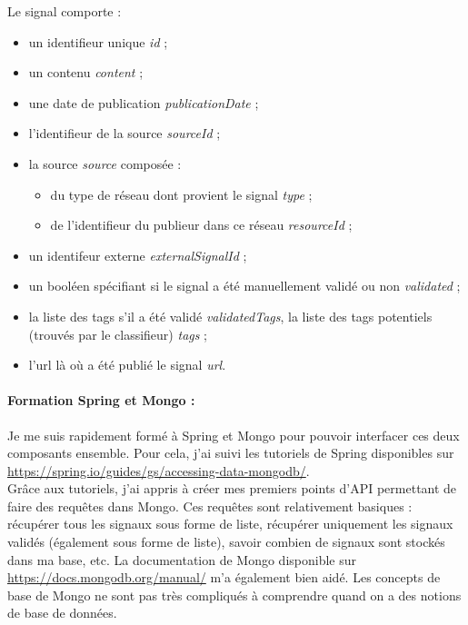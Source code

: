         Le signal comporte :
        \begin{itemize}
            \item un identifieur unique \textit{id} ;
            \item un contenu \textit{content} ;
            \item une date de publication \textit{publicationDate} ;
            \item l'identifieur de la source \textit{sourceId} ;
            \item la source \textit{source} composée :
            \begin{itemize}
                \item du type de réseau dont provient le signal \textit{type} ;
                \item de l'identifieur du publieur dans ce réseau \textit{resourceId} ;
            \end{itemize}
            \item un identifeur externe \textit{externalSignalId} ;
            \item un booléen spécifiant si le signal a été manuellement validé ou non \textit{validated} ;
            \item la liste des tags s'il a été validé \textit{validatedTags}, la liste des tags potentiels (trouvés par le classifieur) \textit{tags} ;
            \item l'url là où a été publié le signal \textit{url}.
        \end{itemize}

        \paragraph{Formation Spring et Mongo :}
            Je me suis rapidement formé à Spring et Mongo pour pouvoir interfacer ces deux composants ensemble. Pour cela, j'ai suivi les tutoriels de Spring disponibles sur \href{https://spring.io/guides/gs/accessing-data-mongodb/}{https://spring.io/guides/gs/accessing-data-mongodb/}.\\
            Grâce aux tutoriels, j'ai appris à créer mes premiers points d'API permettant de faire des requêtes dans Mongo. Ces requêtes sont relativement basiques : récupérer tous les signaux sous forme de liste, récupérer uniquement les signaux validés (également sous forme de liste), savoir combien de signaux sont stockés dans ma base, etc. La documentation de Mongo disponible sur \href{https://docs.mongodb.org/manual/}{https://docs.mongodb.org/manual/} m'a également bien aidé. Les concepts de base de Mongo ne sont pas très compliqués à comprendre quand on a des notions de base de données.\\

